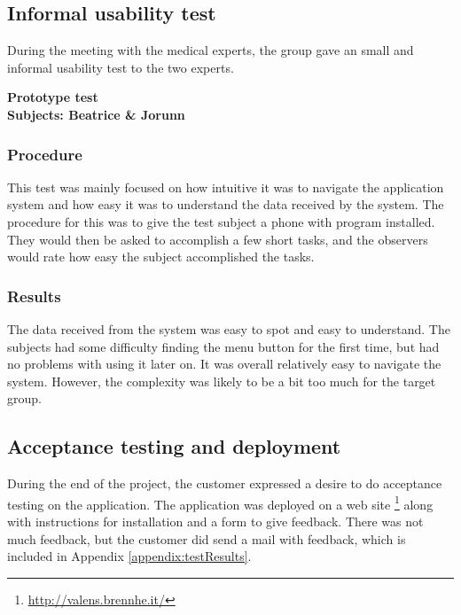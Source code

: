 \subsection{Informal usability test}
During the meeting with the medical experts, the group gave an small and informal usability test to the two experts. 

\textbf{Prototype test}\\
\textbf{Subjects: Beatrice \& Jorunn}
\\

\subsubsection{Procedure}
This test was mainly focused on how intuitive it was to navigate the application system and how easy it was to understand the data received by the system. The procedure for this was to give the test subject a phone with program installed. They would then be asked to accomplish a few short tasks, and the observers would rate how easy the subject accomplished the tasks. 

\subsubsection{Results}
The data received from the system was easy to spot and easy to understand. The subjects had some difficulty finding the menu button for the first time, but had no problems with using it later on. It was overall relatively easy to navigate the system. However, the complexity was likely to be a bit too much for the target group.

\subsection{Acceptance testing and deployment}
During the end of the project, the customer expressed a desire to do acceptance testing on the application. The application was deployed on a web site \footnote{\url{http://valens.brennhe.it/}} along with instructions for installation and a form to give feedback. There was not much feedback, but the customer did send a mail with feedback, which is included in Appendix \ref{appendix:testResults}.